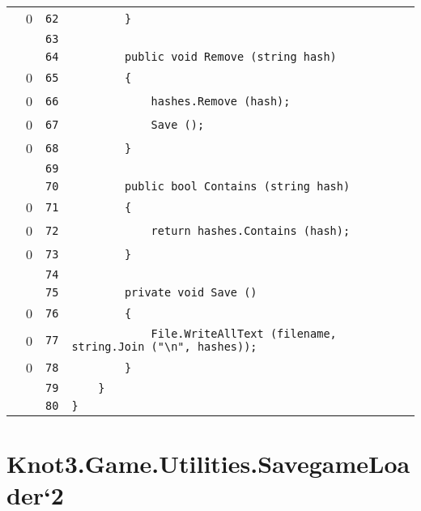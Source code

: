 \documentclass[a4paper,10pt]{article}
\begin{document}
\begin{longtable}[l]{lrrl}
\cellcolor{red} & 0 & \verb~62~ & \verb~        }~\\
\cellcolor{gray} &  & \verb~63~ & \verb~~\\
\cellcolor{gray} &  & \verb~64~ & \verb~        public void Remove (string hash)~\\
\cellcolor{red} & 0 & \verb~65~ & \verb~        {~\\
\cellcolor{red} & 0 & \verb~66~ & \verb~            hashes.Remove (hash);~\\
\cellcolor{red} & 0 & \verb~67~ & \verb~            Save ();~\\
\cellcolor{red} & 0 & \verb~68~ & \verb~        }~\\
\cellcolor{gray} &  & \verb~69~ & \verb~~\\
\cellcolor{gray} &  & \verb~70~ & \verb~        public bool Contains (string hash)~\\
\cellcolor{red} & 0 & \verb~71~ & \verb~        {~\\
\cellcolor{red} & 0 & \verb~72~ & \verb~            return hashes.Contains (hash);~\\
\cellcolor{red} & 0 & \verb~73~ & \verb~        }~\\
\cellcolor{gray} &  & \verb~74~ & \verb~~\\
\cellcolor{gray} &  & \verb~75~ & \verb~        private void Save ()~\\
\cellcolor{red} & 0 & \verb~76~ & \verb~        {~\\
\cellcolor{red} & 0 & \verb~77~ & \verb~            File.WriteAllText (filename, string.Join ("\n", hashes));~\\
\cellcolor{red} & 0 & \verb~78~ & \verb~        }~\\
\cellcolor{gray} &  & \verb~79~ & \verb~    }~\\
\cellcolor{gray} &  & \verb~80~ & \verb~}~\\
\end{longtable}
\newpage
\section{Knot3.Game.Utilities.SavegameLoader`2}
\end{document}
